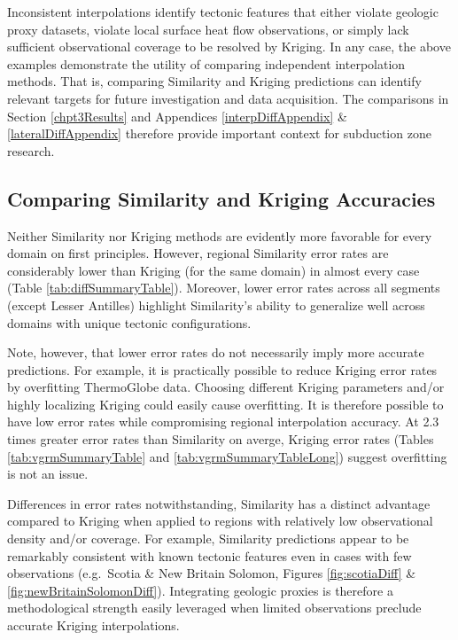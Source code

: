 Inconsistent interpolations identify tectonic features that either violate geologic proxy datasets, violate local surface heat flow observations, or simply lack sufficient observational coverage to be resolved by Kriging. In any case, the above examples demonstrate the utility of comparing independent interpolation methods. That is, comparing Similarity and Kriging predictions can identify relevant targets for future investigation and data acquisition. The comparisons in Section \ref{chpt3Results} and Appendices \ref{interpDiffAppendix} \& \ref{lateralDiffAppendix} therefore provide important context for subduction zone research.

\hypertarget{comparing-similarity-and-kriging-accuracies-1}{%
\subsection{Comparing Similarity and Kriging Accuracies}\label{comparing-similarity-and-kriging-accuracies-1}}

Neither Similarity nor Kriging methods are evidently more favorable for every domain on first principles. However, regional Similarity error rates are considerably lower than Kriging (for the same domain) in almost every case (Table \ref{tab:diffSummaryTable}). Moreover, lower error rates across all segments (except Lesser Antilles) highlight Similarity's ability to generalize well across domains with unique tectonic configurations.

Note, however, that lower error rates do not necessarily imply more accurate predictions. For example, it is practically possible to reduce Kriging error rates by overfitting ThermoGlobe data. Choosing different Kriging parameters and/or highly localizing Kriging could easily cause overfitting. It is therefore possible to have low error rates while compromising regional interpolation accuracy. At 2.3 times greater error rates than Similarity on averge, Kriging error rates (Tables \ref{tab:vgrmSummaryTable} and \ref{tab:vgrmSummaryTableLong}) suggest overfitting is not an issue.

Differences in error rates notwithstanding, Similarity has a distinct advantage compared to Kriging when applied to regions with relatively low observational density and/or coverage. For example, Similarity predictions appear to be remarkably consistent with known tectonic features even in cases with few observations (e.g.~Scotia \& New Britain Solomon, Figures \ref{fig:scotiaDiff} \& \ref{fig:newBritainSolomonDiff}). Integrating geologic proxies is therefore a methodological strength easily leveraged when limited observations preclude accurate Kriging interpolations.

